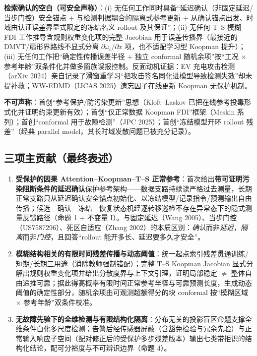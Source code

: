 \documentclass[11pt,a4paper]{ctexart}
\theoremstyle{remark}
\begin{document}
\textbf{检索确认的空白（可安全声称）}：(i) 无任何工作同时具备“延迟确认（非固定延迟/当步门控）安全锚点 + 与检测判据耦合的隔离式参考更新 + 从确认锚点出发、时域由认证误差界显式限定的冻结名义 rollout 及其保证”；(ii) 无任何 T--S 模糊 FDI 工作推导含规则权重变化项的完整 Jacobian 用于误差传播界（最接近的 DMVT/扇形界路线不显式分离 $\partial\omega_i/\partial x$ 项，也不适配学习型 Koopman 提升）；(iii) 无任何工作把“确定性传播误差半径 + 独立 conformal 随机余项”按“工况 × 参考年龄”双条件化并做多窗族误报控制。反面动机证据：EV 充电攻击检测（arXiv 2024）亲自记录了滑窗重学习“把攻击签名同化进模型导致检测失效”却未提补救；WW-EDMD（IJCAS 2025）遗忘因子在线更新 Koopman 无保护机制。

\textbf{不可声称}：首创“参考保护/防污染更新”思想（Kloft--Laskov 已把在线参考投毒形式化并证明约束更新有效）；首创“仅正常数据 Koopman FDI”框架（Meskin 系列）；首创“conformal 用于故障检测”（JPC 2025）；首创“冻结模型开环 rollout 残差”（经典 parallel model，其长时域发散问题已被充分记录）。

\subsection{三项主贡献（最终表述）}

\begin{enumerate}
\item \textbf{受保护的因果 Attention--Koopman--T--S 正常参考}：首次给出\textbf{带可证明污染阻断条件的延迟确认}保护参考架构——数据支路持续读严格过去测量，长期正常支路只从延迟确认安全锚点初始化、以冻结模型/记录指令/预测输出自由传播；候选—确认—冻结—恢复状态机经逐转移巡检不存在异常态下的隐式测量反馈路径（命题 1 + 不变量 I）。与固定延迟（Wang 2005）、当步门控（US7587296）、死区自适应（Zhang 2002）的本质区别：\textit{确认}而非\textit{延迟}，\textit{隔离}而非\textit{门控}，且回答“rollout 能开多长、延迟要多久才安全”。
\item \textbf{模糊结构相关的有限时间残差传播与动态阈值}：统一起点索引残差贯通训练/短期/长期三用途（消除教师强制错配）；完整 T--S Koopman Jacobian 显式分解出规则权重变化项并给出分散度界与上下文引理，证明局部稳定 $\ne$ 整体自由递推可靠；据此得高概率有限时间正常参考半径与可靠预测长度，生成动态阈值的确定性部分，随机余项由可观测超额得分的块 conformal 按“模糊区域 × 参考年龄”双条件校准。
\item \textbf{无故障先验下的全维检测与有限结构化隔离}：分布无关的投影盲区命题支撑全维条件白化多尺度检测；告警后经传感器屏蔽（含豁免检验与冗余先验）与正常输入响应子空间（配对修正后的受保护多步残差版本）输出七类带拒识的结构化结论，配可分裕度与不可辨识边界（命题 4）。
\end{enumerate}
\end{document}
